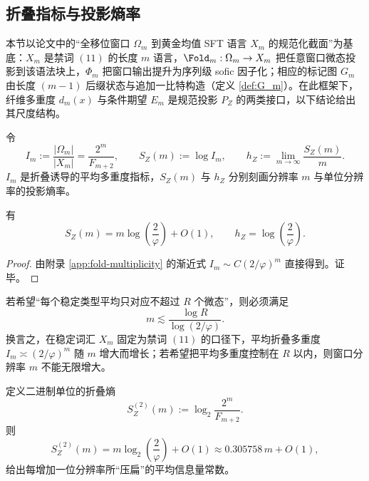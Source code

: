 \subsection{折叠指标与投影熵率}\label{subsec:pom-projection-entropy}
本节以论文中的“全移位窗口 $\Omega_m$ 到黄金均值 SFT 语言 $X_m$ 的规范化截面”为基底：$X_m$ 是禁词 $(11)$ 的长度 $m$ 语言，$\Fold_m:\Omega_m\to X_m$ 把任意窗口微态投影到该语法块上，$\Phi_m$ 把窗口输出提升为序列级 sofic 因子化；相应的标记图 $G_m$ 由长度 $(m-1)$ 后缀状态与追加一比特构造（定义 \ref{def:G_m}）。在此框架下，纤维多重度 $d_m(x)$ 与条件期望 $E_m$ 是规范投影 $P_Z$ 的两类接口，以下结论给出其尺度结构。
\begin{definition}[折叠指标与投影熵率]\label{def:pom-fold-index}
令
\[
I_m:=\frac{|\Omega_m|}{|X_m|}=\frac{2^m}{F_{m+2}},
\qquad
S_Z(m):=\log I_m,
\qquad
h_Z:=\lim_{m\to\infty}\frac{S_Z(m)}{m}.
\]
$I_m$ 是折叠诱导的平均多重度指标，$S_Z(m)$ 与 $h_Z$ 分别刻画分辨率 $m$ 与单位分辨率的投影熵率。
\end{definition}

\begin{proposition}[折叠指标的渐近]\label{prop:pom-projection-entropy}
有
\[
S_Z(m)=m\log\!\left(\frac{2}{\varphi}\right)+O(1),
\qquad
h_Z=\log\!\left(\frac{2}{\varphi}\right).
\]
\end{proposition}
\begin{proof}
由附录 \ref{app:fold-multiplicity} 的渐近式
\(
I_m\sim C(2/\varphi)^m
\)
直接得到。证毕。
\end{proof}

\begin{corollary}[分辨率不足的空间门槛]\label{cor:pom-resolution-threshold}
若希望“每个稳定类型平均只对应不超过 $R$ 个微态”，则必须满足
\[
m\lesssim \frac{\log R}{\log(2/\varphi)}.
\]
换言之，在稳定词汇 $X_m$ 固定为禁词 $(11)$ 的口径下，平均折叠多重度 $I_m\asymp (2/\varphi)^m$ 随 $m$ 增大而增长；若希望把平均多重度控制在 $R$ 以内，则窗口分辨率 $m$ 不能无限增大。
\end{corollary}

\begin{remark}[折叠熵的二进制斜率]\label{rem:pom-fold-bits}
定义二进制单位的折叠熵
\[
S_Z^{(2)}(m):=\log_2\frac{2^m}{F_{m+2}}.
\]
则
\[
S_Z^{(2)}(m)=m\log_2\!\left(\frac{2}{\varphi}\right)+O(1)
\approx 0.305758\,m+O(1),
\]
给出每增加一位分辨率所“压扁”的平均信息量常数。
\end{remark}

